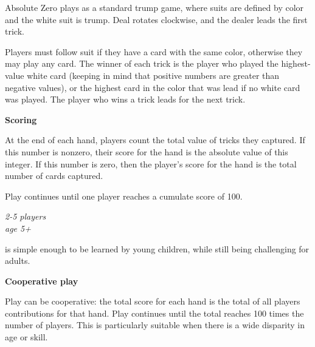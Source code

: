 \documentclass[11pt]{article}
\newcommand\myssection[1]{\begin{center}\bf\small\noindent #1\end{center}}
\begin{document}
\noindent Absolute Zero plays as a standard trump game, where suits
are defined by color and the white suit is trump.  Deal rotates
clockwise, and the dealer leads the first trick.

Players must follow suit if they have a card with the same color,
otherwise they may play any card.  The winner of each trick is the
player who played the highest-value white card (keeping in mind that
positive numbers are greater than negative values), or the highest
card in the color that was lead if no white card was played.  The player
who wins a trick leads for the next trick.

\clearpage
{}

\myssection{Scoring} At the end of each hand, players count the
total value of tricks they captured.  If this number is nonzero, their
score for the hand is the absolute value of this integer.  If this
number is zero, then the player's score for the hand is the total
number of cards captured.

Play continues until one player reaches a cumulate score of 100.

\clearpage
{}

\begin{center}
  \em 2-5 players\\
  age 5+
\end{center}

 is simple enough to be learned by young
children, while still being challenging for adults.

\myssection{Cooperative play} Play can be cooperative: the total score
for each hand is the total of all players contributions for that hand.
Play continues until the total reaches 100 times the number of
players.  This is particularly suitable when there is a wide disparity
in age or skill.
\end{document}
